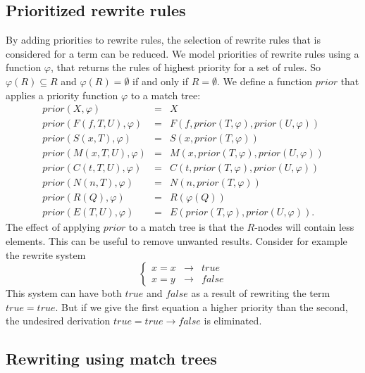 \documentclass{article}
\begin{document}
\subsection{Prioritized rewrite rules}

By adding priorities to rewrite rules, the selection of rewrite rules that
is considered for a term can be reduced. We model priorities of rewrite
rules using a function $\varphi $, that returns the rules of highest
priority for a set of rules. So $\varphi (R)\subseteq R$ and $\varphi
(R)=\emptyset $ if and only if $R=\emptyset $. We define a function $prior$
that applies a priority function $\varphi $ to a match tree:%
\begin{equation*}
\begin{array}{lll}
prior(X,\varphi ) & = & X \\ 
prior(F(f,T,U),\varphi ) & = & F(f,prior(T,\varphi ),prior(U,\varphi )) \\ 
prior(S(x,T),\varphi ) & = & S(x,prior(T,\varphi )) \\ 
prior(M(x,T,U),\varphi ) & = & M(x,prior(T,\varphi ),prior(U,\varphi )) \\ 
prior(C(t,T,U),\varphi ) & = & C(t,prior(T,\varphi ),prior(U,\varphi )) \\ 
prior(N(n,T),\varphi ) & = & N(n,prior(T,\varphi )) \\ 
prior(R(Q),\varphi ) & = & R(\varphi (Q)) \\ 
prior(E(T,U),\varphi ) & = & E(prior(T,\varphi ),prior(U,\varphi )).%
\end{array}%
\end{equation*}%
The effect of applying $prior$ to a match tree is that the $R$-nodes will
contain less elements.  This can be useful to remove unwanted results.
Consider for example the rewrite system%
\begin{equation*}
\left\{ 
\begin{array}{ccc}
x=x & \rightarrow  & true \\ 
x=y & \rightarrow  & false%
\end{array}%
\right. 
\end{equation*}%
This system can have both $true$ and $false$ as a result of rewriting the
term $true=true$. But if we give the first equation a higher priority than
the second, the undesired derivation $true=true\rightarrow false$ is
eliminated.

\subsection{Rewriting using match trees}
\end{document}
